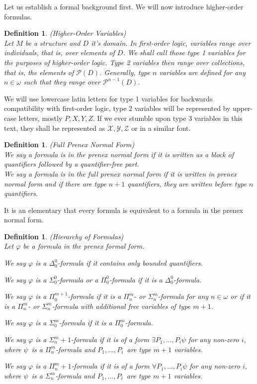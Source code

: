 \documentclass[12pt,a4paper]{article}
\newtheorem{definition}[theorem]{Definition}
\newcommand{\power}[1]{\ensuremath{\mathscr{P}} (#1)}
\newcommand{\bce}{\begin{compactenum}}
\newcommand{\ece}{\end{compactenum}}
\begin{document}
Let us establish a formal background first. We will now introduce higher-order formulas.

\begin{definition}{(Higher-Order Variables)}\label{def:higher_order_variables}\\
Let $M$ be a structure and $D$ it's domain. In first-order logic, variables range over individuals, that is, over elements of $D$. We shall call those \emph{type 1 variables} for the purposes of higher-order logic. Type 2 variables then range over collections, that is, the elements of $\power{D}$. Generally, type $n$ variables are defined for any $n \in \omega$ such that they range over $\mathscr{P}^{n-1}(D)$.
\end{definition}
We will use lowercase latin letters for type 1 variables for backwards compatibility with first-order logic, type 2 variables will be represented by upper-case letters, mostly $P, X, Y, Z$. If we ever stumble upon type 3 variables in this text, they shall be represented as $\mathscr{X}, \mathscr{Y}, \mathscr{Z}$ or in a similar font.

\begin{definition}{(Full Prenex Normal Form)}\label{def:pnf}\\
We say a formula is in the \emph{prenex normal form} if it is written as a block of quantifiers followed by a quantifier-free part.\\
We say a formula is in the \emph{full prenex normal form} if it is written in \emph{prenex normal form} and if there are type $n+1$ quantifiers, they are written before type $n$ quantifiers.
\end{definition}
It is an elementary that every formula is equivalent to a formula in the prenex normal form.


\begin{definition}{(Hierarchy of Formulas)}\label{def:analytical_hierarchy}\\
Let $\varphi$ be a formula in the prenex formal form.
\bce[(i)]
\item We say $\varphi$ is a $\Delta^0_0$-formula if it contains only bounded quantifiers.
\item We say $\varphi$ is a $\Sigma^0_0$-formula or a $\Pi^0_0$-formula if it is a $\Delta^0_0$-formula.
\item We say $\varphi$ is a $\Pi^{m+1}_0$-formula if it is a $\Pi^m_n$- or $\Sigma^m_n$-formula for any $n \in \omega$ or if it is a $\Pi^m_n$- or $\Sigma^m_n$-formula with additional free variables of type $m+1$.
\item We say $\varphi$ is a $\Sigma^m_0$-formula if it is a $\Pi^m_0$-formula.
\item We say $\varphi$ is a $\Sigma^m_n+1$-formula if it is of a form $\exists P_1, \ldots, P_i \psi$ for any non-zero $i$, where $\psi$ is a $\Pi^m_n$-formula and $P_1, \ldots, P_i$ are type $m+1$ variables.
\item We say $\varphi$ is a $\Pi^m_n+1$-formula if it is of a form $\forall P_1, \ldots, P_i \psi$ for any non-zero $i$, where $\psi$ is a $\Sigma^m_n$-formula and $P_1, \ldots, P_i$ are type $m+1$ variables.
\ece
\end{definition}
\end{document}
